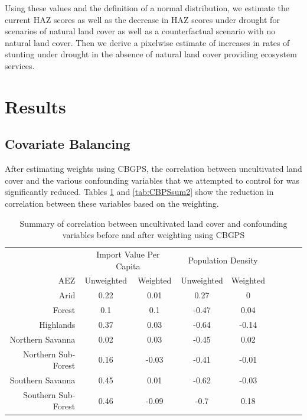 \documentclass{article}
\begin{document}
Using these values and the definition of a normal distribution, we estimate the current HAZ scores as well as the decrease in HAZ scores under drought for scenarios of natural land cover as well as a counterfactual scenario with no natural land cover.  Then we derive a pixelwise estimate of increases in rates of stunting under drought in the absence of natural land cover providing ecosystem services.

\section{Results}
\subsection{Covariate Balancing}
After estimating weights using CBGPS, the correlation between uncultivated land cover and the various confounding variables that we attempted to control for was significantly reduced.  Tables \ref{tab:CBPSsum1} and \ref{tab:CBPSsum2} show the reduction in correlation between these variables based on the weighting.

\begin{table}[h!]
	\begin{center}
		\begin{tabular}{r | c c c c c c c c }
	&	\multicolumn{2}{c}{Import Value Per Capita}			&	\multicolumn{2}{c}{Population Density}			\\
	\cmidrule(lr){2-3}\cmidrule(lr){4-5}
AEZ	&	Unweighted	&	Weighted	&	Unweighted	&	Weighted	\\
\hline									
Arid	&	0.22	&	0.01	&	0.27	&	0	\\
Forest	&	0.1	&	0.1	&	-0.47	&	0.04	\\
Highlands	&	0.37	&	0.03	&	-0.64	&	-0.14	\\
Northern Savanna	&	0.02	&	0.03	&	-0.45	&	0.02	\\
Northern Sub-Forest	&	0.16	&	-0.03	&	-0.41	&	-0.01	\\
Southern Savanna	&	0.45	&	0.01	&	-0.62	&	-0.03	\\
Southern Sub-Forest	&	0.46	&	-0.09	&	-0.7	&	0.18	\\	
		\end{tabular}
	\caption{Summary of correlation between uncultivated land cover and confounding variables before and after weighting using CBGPS}
	\label{tab:CBPSsum1}
	\end{center}
\end{table}
\end{document}
